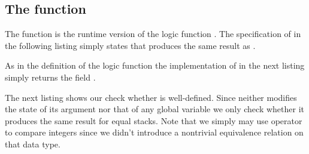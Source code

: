 
\subsection{The function \stacksize}

The function \stacksize is the runtime version of the logic function
.
The specification of \stacksize in the following listing
simply states that \stacksize produces the same result as \StackSize.



As in the definition of the logic function \StackSize the implementation of
\stacksize in the next listing simply returns the field .



The next listing shows our check whether \stacksize is well-defined.
Since \stacksize neither modifies the state of its \stacktype argument 
nor that of any global variable we only check whether it
produces the same result for equal stacks.
Note that we simply may use operator~\inl{==} to compare integers since we
didn't introduce a nontrivial equivalence relation on that data type.



